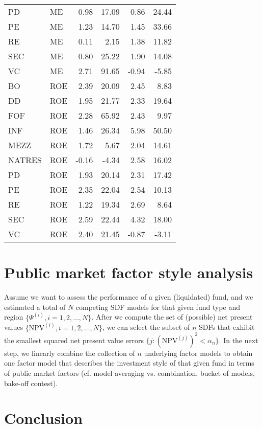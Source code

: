 \documentclass[12pt]{article}
\begin{document}
\begin{table}[ht]
\begin{tabular}{llrrrr}
		PD & ME & 0.98 & 17.09 & 0.86 & 24.44 \\ 
		PE & ME & 1.23 & 14.70 & 1.45 & 33.66 \\ 
		RE & ME & 0.11 & 2.15 & 1.38 & 11.82 \\ 
		SEC & ME & 0.80 & 25.22 & 1.90 & 14.08 \\ 
		VC & ME & 2.71 & 91.65 & -0.94 & -5.85 \\ 
		BO & ROE & 2.39 & 20.09 & 2.45 & 8.83 \\ 
		DD & ROE & 1.95 & 21.77 & 2.33 & 19.64 \\ 
		FOF & ROE & 2.28 & 65.92 & 2.43 & 9.97 \\ 
		INF & ROE & 1.46 & 26.34 & 5.98 & 50.50 \\ 
		MEZZ & ROE & 1.72 & 5.67 & 2.04 & 14.61 \\ 
		NATRES & ROE & -0.16 & -4.34 & 2.58 & 16.02 \\ 
		PD & ROE & 1.93 & 20.14 & 2.31 & 17.42 \\ 
		PE & ROE & 2.35 & 22.04 & 2.54 & 10.13 \\ 
		RE & ROE & 1.22 & 19.34 & 2.69 & 8.64 \\ 
		SEC & ROE & 2.59 & 22.44 & 4.32 & 18.00 \\ 
		VC & ROE & 2.40 & 21.45 & -0.87 & -3.11 \\ 
		\hline
	\end{tabular}
\end{table}


\section{Public market factor style analysis}

Assume we want to assess the performance of a given (liquidated) fund, and we estimated a total of $N$ competing SDF models for that given fund type and region $\{ \Psi^{(i)}, i=1,2,\dots,N \}$.
After we compute the set of (possible) net present values $\{ \mathrm{NPV}^{(i)}, i=1,2,\dots,N \}$, we can select the subset of $n$ SDFs that exhibit the smallest squared net present value errors $\{ j: (\mathrm{NPV}^{(j)})^2 < \alpha_n \}$.
In the next step, we linearly combine the collection of $n$ underlying factor models to obtain one factor model that describes the investment style of that given fund in terms of public market factors (cf. model averaging vs. combination, bucket of models, bake-off contest).


\section{Conclusion}



\end{document}
